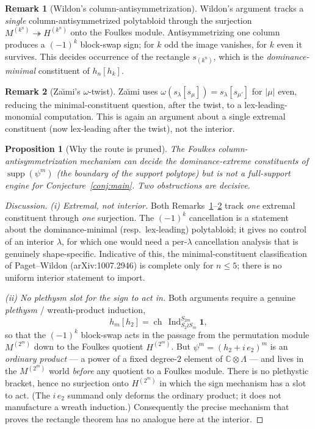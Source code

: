 \documentclass[11pt]{article}
\newtheorem{proposition}{Proposition}
\theoremstyle{definition}
\newtheorem{remark}{Remark}
\newcommand{\C}{\mathbb{C}}
\newcommand{\Lam}{\Lambda}
\DeclareMathOperator{\supp}{supp}
\DeclareMathOperator{\Ind}{Ind}
\DeclareMathOperator{\ch}{ch}
\begin{document}
\begin{remark}[Wildon's column-antisymmetrization]\label{rem:wildon}
Wildon's argument tracks a \emph{single} column-antisymmetrized
polytabloid through the surjection $M^{(k^n)}\twoheadrightarrow H^{(k^n)}$
onto the Foulkes module. Antisymmetrizing one column produces a
$(-1)^k$ block-swap sign; for $k$ odd the image vanishes, for $k$ even it
survives. This decides occurrence of the rectangle $s_{(k^n)}$, which is
the \emph{dominance-minimal} constituent of $h_n[h_k]$.
\end{remark}

\begin{remark}[Za\u{\i}mi's $\omega$-twist]\label{rem:zaimi}
Za\u{\i}mi uses $\omega(s_\lambda[s_\mu])=s_\lambda[s_{\mu'}]$ for
$|\mu|$ even, reducing the minimal-constituent question, after the twist,
to a lex-leading-monomial computation. This is again an argument about a
single extremal constituent (now lex-leading after the twist), not the
interior.
\end{remark}

\begin{proposition}[Why the route is pruned]\label{prop:foulkes-pruned}
The Foulkes column-antisymmetrization mechanism can decide the
dominance-extreme constituents of $\supp(\psi^m)$ (the boundary of the
support polytope) but is not a full-support engine for
Conjecture~\ref{conj:main}. Two obstructions are decisive.
\end{proposition}

\begin{proof}[Discussion]
\emph{(i) Extremal, not interior.} Both
Remarks~\ref{rem:wildon}--\ref{rem:zaimi} track \emph{one} extremal
constituent through \emph{one} surjection. The $(-1)^k$ cancellation is a
statement about the dominance-minimal (resp.\ lex-leading) polytabloid;
it gives no control of an interior $\lambda$, for which one would need a
per-$\lambda$ cancellation analysis that is genuinely shape-specific.
Indicative of this, the minimal-constituent classification of
Paget--Wildon (arXiv:1007.2946) is complete only for $n\le 5$; there is no
uniform interior statement to import.

\emph{(ii) No plethysm slot for the sign to act in.} Both arguments
require a genuine \emph{plethysm} / wreath-product induction,
\[
  h_m[h_2]=\ch\,\Ind_{S_2\wr S_m}^{S_{2m}} \mathbf{1},
\]
so that the $(-1)^k$ block-swap acts in the passage from the
permutation module $M^{(2^m)}$ down to the Foulkes quotient $H^{(2^m)}$.
But $\psi^m=(h_2+i\,e_2)^m$ is an \emph{ordinary product} --- a power of a
fixed degree-$2$ element of $\C\otimes\Lam$ --- and lives in the
$M^{(2^m)}$ world \emph{before} any quotient to a Foulkes module. There is
no plethystic bracket, hence no surjection onto $H^{(2^m)}$ in which the
sign mechanism has a slot to act. (The $i\,e_2$ summand only deforms the
ordinary product; it does not manufacture a wreath induction.)
Consequently the precise mechanism that proves the rectangle theorem has
no analogue here at the interior.
\end{proof}
\end{document}
